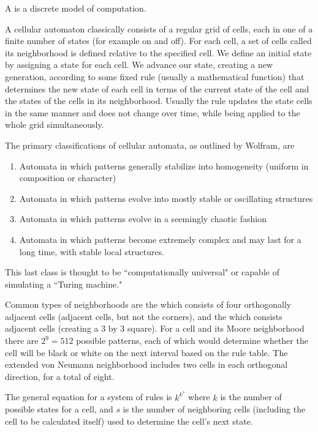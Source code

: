 \documentclass[12pt, a4paper, oneside, openright, titlepage]{book}
\begin{document}
\begin{defn}
    A  is a discrete model of computation. 
\end{defn}

A cellular automaton classically consists of a regular grid of cells, each in one of a finite number of states (for example on and off). For each cell, a set of cells called its neighborhood is defined relative to the specified cell. We define an initial state by assigning a state for each cell. We advance our state, creating a new generation, according to some fixed rule (usually a mathematical function) that determines the new state of each cell in terms of the current state of the cell and the states of the cells in its neighborhood. Usually the rule updates the state cells in the same manner and does not change over time, while being applied to the whole grid simultaneously.

The primary classifications of cellular automata, as outlined by Wolfram, are \begin{enumerate}
    \item Automata in which patterns generally stabilize into homogeneity (uniform in composition or character)
    \item Automata in which patterns evolve into mostly stable or oscillating structures
    \item Automata in which patterns evolve in a seemingly chaotic fashion
    \item Automata in which patterns become extremely complex and may last for a long time, with stable local structures.
\end{enumerate}
This last class is thought to be ``computationally universal" or capable of simulating a ``Turing machine."

Common types of neighborhoods are the  which consists of four orthogonally adjacent cells (adjacent cells, but not the corners), and the  which consists adjacent cells (creating a 3 by 3 square). For a cell and its Moore neighborhood there are $2^9 = 512$ possible patterns, each of which would determine whether the cell will be black or white on the next interval based on the rule table. The extended von Neumann neighborhood includes two cells in each orthogonal direction, for a total of eight.

\begin{prop}
    The general equation for a system of rules is $k^{k^s}$ where $k$ is the number of possible states for a cell, and $s$ is the number of neighboring cells (including the cell to be calculated itself) used to determine the cell's next state.
\end{prop}
\end{document}
